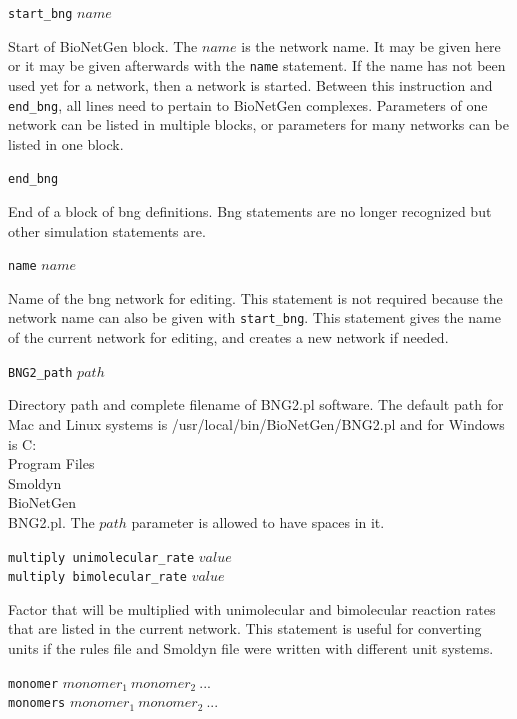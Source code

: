 \documentclass {scrbook}
\newcommand {\ttt} {\texttt}
\begin{document}
\begin{description}

\item{\ttt{start\_bng} $name$}

Start of BioNetGen block. The $name$ is the network name. It may be given here or it may be given afterwards with the \ttt{name} statement. If the name has not been used yet for a network, then a network is started. Between this instruction and \ttt{end\_bng}, all lines need to pertain to BioNetGen complexes. Parameters of one network can be listed in multiple blocks, or parameters for many networks can be listed in one block.

\item{\ttt{end\_bng}}

End of a block of bng definitions. Bng statements are no longer recognized but other simulation statements are.

\item{\ttt{name} $name$}

Name of the bng network for editing. This statement is not required because the network name can also be given with \ttt{start\_bng}. This statement gives the name of the current network for editing, and creates a new network if needed.

\item{\ttt{BNG2\_path} $path$}

Directory path and complete filename of BNG2.pl software. The default path for Mac and Linux systems is /usr/local/bin/BioNetGen/BNG2.pl and for Windows is C:\\Program Files\\Smoldyn\\BioNetGen\\BNG2.pl. The $path$ parameter is allowed to have spaces in it.

\item{\ttt{multiply unimolecular\_rate} $value$\\
\ttt{multiply bimolecular\_rate} $value$}

Factor that will be multiplied with unimolecular and bimolecular reaction rates that are listed in the current network. This statement is useful for converting units if the rules file and Smoldyn file were written with different unit systems.

\item{\ttt{monomer} $monomer_1\ monomer_2\ ...$\\
\ttt{monomers} $monomer_1\ monomer_2\ ...$}


\end{description}
\end{document}
